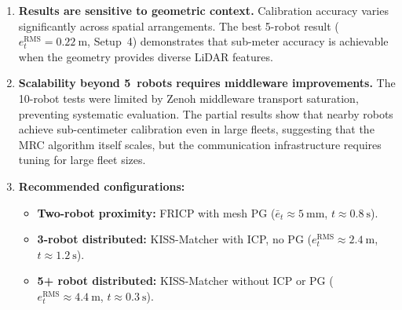 \begin{enumerate}
    \item \textbf{Results are sensitive to geometric context.}
          Calibration accuracy varies significantly across spatial
          arrangements.
          The best 5-robot result
          ($e_t^\mathrm{RMS} = \SI{0.22}{\metre}$, Setup~4)
          demonstrates that sub-meter accuracy is achievable when
          the geometry provides diverse LiDAR features.

    \item \textbf{Scalability beyond 5~robots requires middleware
          improvements.}
          The 10-robot tests were limited by Zenoh middleware
          transport saturation, preventing systematic evaluation.
          The partial results show that nearby robots achieve
          sub-centimeter calibration even in large fleets,
          suggesting that the MRC algorithm itself scales, but the
          communication infrastructure requires tuning for
          large fleet sizes.

    \item \textbf{Recommended configurations:}
          \begin{itemize}
              \item \textbf{Two-robot proximity:} FRICP with mesh PG
                    ($\bar{e}_t \approx \SI{5}{\milli\metre}$,
                    $t \approx \SI{0.8}{\second}$).
              \item \textbf{3-robot distributed:} KISS-Matcher with
                    ICP, no PG
                    ($e_t^\mathrm{RMS} \approx \SI{2.4}{\metre}$,
                    $t \approx \SI{1.2}{\second}$).
              \item \textbf{5+ robot distributed:} KISS-Matcher
                    without ICP or PG
                    ($e_t^\mathrm{RMS} \approx \SI{4.4}{\metre}$,
                    $t \approx \SI{0.3}{\second}$).
          \end{itemize}
\end{enumerate}

